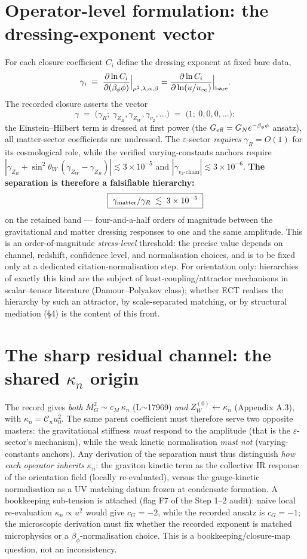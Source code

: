 \documentclass[11pt,a4paper]{article}
\begin{document}
\section{Operator-level formulation: the dressing-exponent vector}
For each closure coefficient $C_i$ define the dressing exponent at fixed bare
data,
\[
\gamma_i\;\equiv\;\frac{\partial\ln C_i}{\partial(\beta_\phi\phi)}
\Big|_{\mu^2,\lambda,\alpha,\beta}
=\frac{\partial\ln C_i}{\partial\ln(u/u_\infty)}\Big|_{\rm bare}.
\]
The recorded closure asserts the vector
\[
\gamma\;=\;\big(\gamma_R;\ \gamma_{Z_B},\gamma_{Z_W},\gamma_{v_2},\dots\big)
\;=\;\big(1;\ 0,0,0,\dots\big):
\]
the Einstein--Hilbert term is dressed at first power (the
$G_{\rm eff}=G_Ne^{-\beta_\phi\phi}$ ansatz), all matter-sector coefficients are
undressed. The $\varepsilon$-sector \emph{requires} $\gamma_R=O(1)$ for its
cosmological role, while the verified varying-constants anchors require
$|\gamma_{Z_B}+\sin^2\!\theta_W\,(\gamma_{Z_W}-\gamma_{Z_B})|\lesssim
3\times10^{-5}$ and $|\gamma_{v_2\text{-chain}}|\lesssim3\times10^{-6}$.
\textbf{The separation is therefore a falsifiable hierarchy:}
\[
\boxed{\;\gamma_{\rm matter}/\gamma_R\;\lesssim\;3\times10^{-5}\;}
\]
on the retained band --- four-and-a-half orders of magnitude between the
gravitational and matter dressing responses to one and the same amplitude. This
is an order-of-magnitude \emph{stress-level} threshold: the precise value
depends on channel, redshift, confidence level, and normalisation choices, and
is to be fixed only at a dedicated citation-normalisation step. For
orientation only: hierarchies of exactly this kind are the subject of
least-coupling/attractor mechanisms in scalar--tensor literature
(Damour--Polyakov class); whether ECT realises the hierarchy by such an
attractor, by scale-separated matching, or by structural mediation (\S4) is the
content of this front.

\section{The sharp residual channel: the shared $\kappa_n$ origin}
The record gives \emph{both} $M_G^2\sim c_M\,\kappa_n$ (L$\sim$17969) \emph{and}
$Z_W^{(0)}\!\leftarrow\!\kappa_n$ (Appendix A.3), with
$\kappa_n=\mathcal C_n u_0^2$. The same parent coefficient must therefore serve
two opposite masters: the gravitational stiffness \emph{must} respond to the
amplitude (that is the $\varepsilon$-sector's mechanism), while the weak kinetic
normalisation \emph{must not} (varying-constants anchors). Any derivation of the
separation must thus distinguish \emph{how each operator inherits} $\kappa_n$:
the graviton kinetic term as the collective IR response of the orientation
field (locally re-evaluated), versus the gauge-kinetic normalisation as a UV
matching datum frozen at condensate formation. A bookkeeping sub-tension is
attached (flag F7 of the Step 1--2 audit): naive local re-evaluation
$\kappa_n\propto u^2$ would give $c_G=-2$, while the recorded ansatz is
$c_G=-1$; the microscopic derivation must fix whether the recorded exponent is
matched microphysics or a $\beta_\phi$-normalisation choice. This is a
bookkeeping/closure-map question, not an inconsistency.
\end{document}
